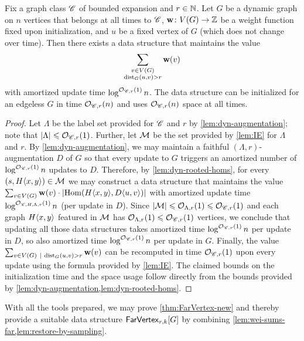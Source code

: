 \begin{lemma}\label{lem:wei-sums-far}
	Fix a graph class $\Cc$ of bounded expansion and $r\in \N$.
	Let $G$ be a dynamic graph on $n$ vertices that belongs at all times to $\Cc$, $\wei\colon V(G)\to \Z$ be a weight function fixed upon initialization, and $u$ be a fixed vertex of $G$ (which does not change over time). Then there exists a data structure that maintains the value
	\[\sum_{\substack{v\in V(G)\\ \dist_{G}(u,v)>r}} \wei(v)\]
	with amortized update time $\log^{\Oh_{\Cc,r}(1)} n$. The data structure can be initialized for an edgeless $G$ in time $\Oh_{\Cc,r}(n)$ and uses $\Oh_{\Cc,r}(n)$ space at all times.
\end{lemma}
\begin{proof}
	Let $\Lambda$ be the label set provided for $\Cc$ and $r$ by \cref{lem:dyn-augmentation}; note that $|\Lambda|\leq \Oh_{\Cc,r}(1)$. Further, let $\Mm$ be the set provided by \cref{lem:IE} for $\Lambda$ and $r$.
	By \cref{lem:dyn-augmentation}, we may maintain a faithful $(\Lambda,r)$-augmentation $D$ of $G$ so that every update to $G$ triggers an amortized number of $\log^{\Oh_{\Cc,r}(1)} n$ updates to $D$. Therefore, by \cref{lem:dyn-rooted-homs}, for every $(s,\rt{H}{x,y})\in \Mm$ we may construct a data structure that maintains the value $\sum_{v\in V(G)} \wei(v)\cdot |\Hom(\rt{H}{x,y},\rt{D}{u,v})|$ with amortized update time $\log^{\Oh_{\Cc,H,\Lambda,r}(1)} n$ (per update in $D$). Since $|\Mm|\leq \Oh_{\Lambda,r}(1)\leq \Oh_{\Cc,r}(1)$ and each graph $\rt{H}{x,y}$ featured in $\Mm$ has $\Oh_{\Lambda,r}(1)\leq \Oh_{\Cc,r}(1)$ vertices, we conclude that updating all those data structures takes amortized time $\log^{\Oh_{\Cc,r}(1)} n$ per update in $D$, so also amortized time $\log^{\Oh_{\Cc,r}(1)} n$ per update in $G$. Finally, the value $\sum_{\substack{v\in V(G)~\mid~ \dist_{G}(u,v)>r}} \wei(v)$ can be recomputed in time $\Oh_{\Cc,r}(1)$ upon every update using the formula provided by \cref{lem:IE}. The claimed bounds on the initialization time and the space usage follow directly from the bounds provided by \cref{lem:dyn-augmentation,lem:dyn-rooted-homs}.
\end{proof}

With all the tools prepared, we may prove \cref{thm:FarVertex-new} and thereby provide a suitable data structure $\farVertexDS{G}{r,k}$ by combining \cref{lem:wei-sums-far,lem:restore-by-sampling}.

